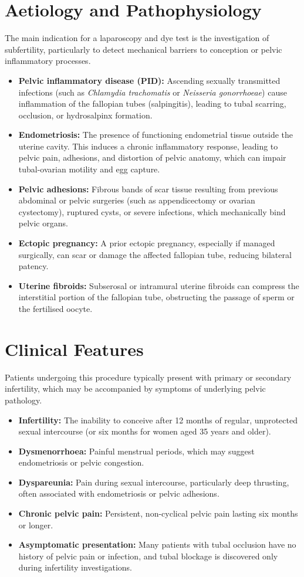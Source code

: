 \section*{Aetiology and Pathophysiology}
The main indication for a laparoscopy and dye test is the investigation of subfertility, particularly to detect mechanical barriers to conception or pelvic inflammatory processes.
\begin{itemize}
    \item \textbf{Pelvic inflammatory disease (PID):} Ascending sexually transmitted infections (such as \textit{Chlamydia trachomatis} or \textit{Neisseria gonorrhoeae}) cause inflammation of the fallopian tubes (salpingitis), leading to tubal scarring, occlusion, or hydrosalpinx formation.
    \item \textbf{Endometriosis:} The presence of functioning endometrial tissue outside the uterine cavity. This induces a chronic inflammatory response, leading to pelvic pain, adhesions, and distortion of pelvic anatomy, which can impair tubal-ovarian motility and egg capture.
    \item \textbf{Pelvic adhesions:} Fibrous bands of scar tissue resulting from previous abdominal or pelvic surgeries (such as appendicectomy or ovarian cystectomy), ruptured cysts, or severe infections, which mechanically bind pelvic organs.
    \item \textbf{Ectopic pregnancy:} A prior ectopic pregnancy, especially if managed surgically, can scar or damage the affected fallopian tube, reducing bilateral patency.
    \item \textbf{Uterine fibroids:} Subserosal or intramural uterine fibroids can compress the interstitial portion of the fallopian tube, obstructing the passage of sperm or the fertilised oocyte.
\end{itemize}

\section*{Clinical Features}
Patients undergoing this procedure typically present with primary or secondary infertility, which may be accompanied by symptoms of underlying pelvic pathology.
\begin{itemize}
    \item \textbf{Infertility:} The inability to conceive after 12 months of regular, unprotected sexual intercourse (or six months for women aged 35 years and older).
    \item \textbf{Dysmenorrhoea:} Painful menstrual periods, which may suggest endometriosis or pelvic congestion.
    \item \textbf{Dyspareunia:} Pain during sexual intercourse, particularly deep thrusting, often associated with endometriosis or pelvic adhesions.
    \item \textbf{Chronic pelvic pain:} Persistent, non-cyclical pelvic pain lasting six months or longer.
    \item \textbf{Asymptomatic presentation:} Many patients with tubal occlusion have no history of pelvic pain or infection, and tubal blockage is discovered only during infertility investigations.
\end{itemize}

